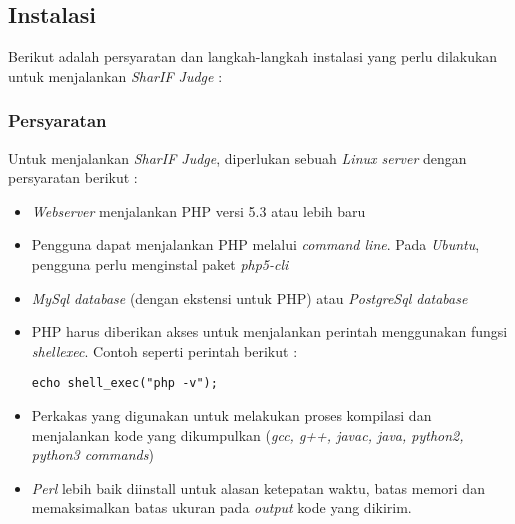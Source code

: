 \subsection{Instalasi}
\label{subsec:instalasi}
Berikut adalah persyaratan dan langkah-langkah instalasi yang perlu dilakukan untuk menjalankan \textit{SharIF Judge} :

\subsubsection{Persyaratan}
\label{subsubsec:persyaratan}
Untuk menjalankan \textit{SharIF Judge}, diperlukan sebuah \textit{Linux server} dengan persyaratan berikut :
\begin{itemize}
	\item \textit{Webserver} menjalankan PHP versi 5.3 atau lebih baru
	\item Pengguna dapat menjalankan PHP melalui \textit{command line}. Pada \textit{Ubuntu}, pengguna perlu menginstal paket \textit{php5-cli}
	\item \textit{MySql database} (dengan ekstensi untuk PHP) atau \textit{PostgreSql database}
	\item PHP harus diberikan akses untuk menjalankan perintah menggunakan fungsi \textit{shell\textunderscore exec}. Contoh seperti perintah berikut :
	\begin{lstlisting}[basicstyle=\ttfamily, frame=single,
	columns=fullflexible, keepspaces=true, breaklines=true, label=ls:1]
	echo shell_exec("php -v");
	\end{lstlisting}
	\item Perkakas yang digunakan untuk melakukan proses kompilasi dan menjalankan kode yang dikumpulkan (\textit{gcc, g++, javac, java, python2, python3 commands})
	\item \textit{Perl} lebih baik diinstall untuk alasan ketepatan waktu, batas memori dan memaksimalkan batas ukuran pada \textit{output} kode yang dikirim.
\end{itemize}

